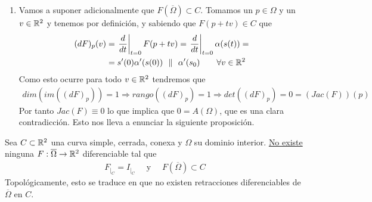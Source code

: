 \begin{observacion}
\begin{enumerate}[start=4]
\begin{enumerate}
            \item Vamos a suponer adicionalmente que $F(\overline{\Omega})\subset C$. Tomamos un $p\in \Omega$ y un $v\in \mathbb{R}^2$ y tenemos por definición, y sabiendo que $F(p+tv)\in C$ que
            \begin{align*}
                (dF)_p(v) &= 
                \left.\frac{d}{dt}\right|_{t=0} F(p+tv) =
                \left.\frac{d}{dt}\right|_{t=0} \alpha(s(t)) =\\
                &= 
                s'(0) \alpha'(s(0))\ \ \| \ \ \alpha'(s_0) \qquad \forall v \in \mathbb{R}^2
            \end{align*}
            Como esto ocurre para todo $v\in \mathbb{R}^2$ tendremos que 
            \begin{gather*}
                dim(im((dF)_p)) = 1  \Rightarrow rango((dF)_p) = 1 \Rightarrow det((dF)_p) = 0 = (Jac(F))(p)
            \end{gather*}
            Por tanto $Jac(F) \equiv 0$ lo que implica que $0=A(\Omega)$, que es una clara contradicción. Esto nos lleva a enunciar la siguiente proposición.
        \end{enumerate}
    \end{enumerate}
\end{observacion}

\begin{prop}
    Sea $C\subset \mathbb{R}^2$ una curva simple, cerrada, conexa y $\Omega$ su dominio interior. \underline{No existe} ninguna $F:\overline{\Omega} \to \mathbb{R}^2$ diferenciable tal que 
    \begin{gather*}
        F_{|_C} = I_{|_C} \quad \text{ y } \quad F(\overline{\Omega})\subset C
    \end{gather*}
    Topológicamente, esto se traduce en que no existen retracciones diferenciables de $\overline{\Omega}$ en $C$.
\end{prop}


